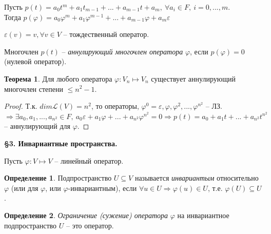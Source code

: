 \documentclass[a4paper, 12pt]{article}
\theoremstyle{definition}
\newtheorem*{definition}{Определение}
\newtheorem*{theorem}{Теорема}
\begin{document}
    Пусть $p(t) = a_0t^m + a_1t_{m-1}+...+a_{m-1}t + a_m,\ 
    \forall a_i \in F,\ i = 0,...,m$.\\ Тогда $p(\varphi) = 
    a_0\varphi^m + a_1\varphi^{m-1}+...+a_{m-1}\varphi + a_m \varepsilon$
    
    $\varepsilon(v) = v, \forall v \in V$ -- тождественный оператор.
    
    Многочлен $p(t)$ -- \textit{аннулирующий многочлен оператора} $\varphi$,
    если $p(\varphi) = 0$ (нулевой оператор).
    \begin{theorem}
        Для любого оператора $\varphi: V_n \longmapsto V_n$
        существует аннулирующий многочлен степени $\leq n^2-1$. 
    \end{theorem}
    \begin{proof}
        Т.к. $dim \mathcal{L}(V) = n^2$, то операторы, $\varphi^0 = \varepsilon,
        \varphi, \varphi^2,..., \varphi^{n^2}$ -- ЛЗ. $\Longrightarrow
        \exists a_0, a_1,..., a_{n^2} \in F,\ 
        a_0\varepsilon + a_1\varphi +...+a_{n^2}\varphi^{n^2} = 0
        \Longrightarrow p(t) = a_0 + a_1t +...+ a_{n^2}t^{n^2}$ --
        аннулирующий для $\varphi$.
        
    \end{proof}

    \begin{center}
        \begin{Large}    
            \textbf{\S3. Инвариантные пространства.}
        \end{Large}
    \end{center}

    Пусть $\varphi: V \longmapsto V$ -- линейный оператор.
    
    \begin{definition}
        Подпространство $U \subseteq V$ называется \textit{
        инвариантым} относительно $\varphi$ (или для $\varphi$,
        или $\varphi$-инвариантным), если $\forall u \in U
        \Longrightarrow \varphi(u) \in U$, т.е. $\varphi(U)
        \subseteq U$. 
    \end{definition}

    \begin{definition}
        \textit{Ограничение (сужение) оператора} $\varphi$
        на инвариантное подпространство $U$ -- это оператор. 
    \end{definition}
\end{document}
